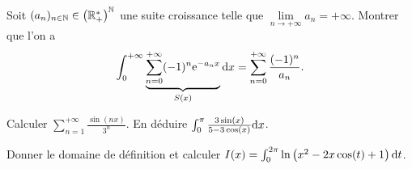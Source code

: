 \documentclass[12pt]{article}
\begin{document}
\begin{exercise}
    Soit $(a_n)_{n\in\mathbb{N}}\in\left(\mathbb{R}_{+}^{*}\right)^{\mathbb{N}}$ une suite croissance telle que $\lim\limits_{n\to+\infty}a_n=+\infty$. Montrer que l'on a 
    \begin{equation}
        \int_{0}^{+\infty}\underbrace{\sum_{n=0}^{+\infty}(-1)^{n}\mathrm{e}^{-a_n x}}_{S(x)}\mathrm{d} x=\sum_{n=0}^{+\infty}\frac{(-1)^{n}}{a_n}.
    \end{equation}
\end{exercise}

\begin{exercise}
    Calculer $\sum_{n=1}^{+\infty}\frac{\sin(nx)}{3^{n}}$. En déduire $\int_{0}^{\pi}\frac{3\sin(x)}{5-3\cos(x)}\mathrm{d} x$.
\end{exercise}

\begin{exercise}
    Donner le domaine de définition et calculer $I(x)=\int_{0}^{2\pi}\ln\left(x^{2}-2x\cos(t)+1\right)\mathrm{d} t$.
\end{exercise}
\end{document}

